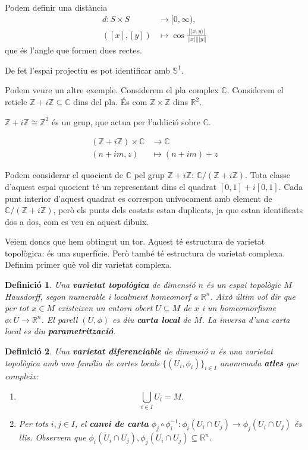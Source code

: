 \documentclass{article}
\newtheorem{definicio}{Definici\'{o}}
\theoremstyle{definition}
\begin{document}
Podem definir una dist\`{a}ncia
\begin{align*}
d:S\times S&\longrightarrow[0,\infty),\\
([x],[y])&\longmapsto\cos\frac{|\langle x,y\rangle|}{||x||||y||}
\end{align*}
que \'{e}s l'angle que formen dues rectes.

De fet l'espai projectiu es pot identificar amb $\mathbb{S}^1$.

Podem veure un altre exemple. Considerem el pla complex $\mathbb{C}$. Considerem el reticle $\mathbb{Z}+i\mathbb{Z}\subseteq\mathbb{C}$ dins del pla. \'{E}s com $\mathbb{Z}\times\mathbb{Z}$ dins $\mathbb{R}^2$.

$\mathbb{Z}+i\mathbb{Z}\cong\mathbb{Z}^2$ \'{e}s un grup, que actua per l'addici\'{o} sobre $\mathbb{C}$.

\begin{align*}
(\mathbb{Z}+i\mathbb{Z})\times\mathbb{C}&\longrightarrow\mathbb{C}\\
(n+im,z)&\longmapsto(n+im)+z
\end{align*}

Podem considerar el quocient de $\mathbb{C}$ pel grup $\mathbb{Z}+i\mathbb{Z}$: $\mathbb{C}/(\mathbb{Z}+i\mathbb{Z})$. Tota classe d'aquest espai quocient t\'{e} un representant dins el quadrat $[0,1]+i[0,1]$. Cada punt interior d'aquest quadrat es correspon un\'{i}vocament amb element de $\mathbb{C}/(\mathbb{Z}+i\mathbb{Z})$, per\`{o} els punts dels costats estan duplicats, ja que estan identificats dos a dos, com es veu en aquest dibuix.

Veiem doncs que hem obtingut un tor. Aquest t\'{e} estructura de varietat topol\`{o}gica: \'{e}s una superf\'{i}cie. Per\`{o} tamb\'{e} t\'{e} estructura de varietat complexa. Definim primer qu\`{e} vol dir varietat complexa.

\begin{definicio}
Una \textbf{varietat topol\`{o}gica} de dimensi\'{o} $n$ \'{e}s un espai topol\`{o}gic $M$ Hausdorff, segon numerable i localment homeomorf a $\mathbb{R}^n$. Aix\`{o} \'{u}ltim vol dir que per tot $x\in M$ existeixen un entorn obert $U\subseteq M$ de $x$ i un homeomorfisme $\phi:U\rightarrow\mathbb{R}^n$. El parell $(U,\phi)$ es diu \textbf{carta local} de $M$. La inversa d'una carta local es diu \textbf{parametritzaci\'{o}}.
\end{definicio}

\begin{definicio}
Una \textbf{varietat diferenciable} de dimensi\'{o} $n$ \'{e}s una varietat topol\`{o}gica amb una fam\'{i}lia de cartes locals $\{(U_i,\phi_i)\}_{i\in I}$ anomenada \textbf{atles} que compleix:
\begin{enumerate}
\item \[\bigcup_{i\in I}U_i=M.\]
\item Per tots $i,j\in I$, el \textbf{canvi de carta} $\phi_j\circ\phi_i^{-1}:\phi_i(U_i\cap U_j)\rightarrow\phi_j(U_i\cap U_j)$ \'{e}s llis. Observem que $\phi_i(U_i\cap U_j),\phi_j(U_i\cap U_j)\subseteq\mathbb{R}^n$.
\end{enumerate}
\end{definicio}
\end{document}
